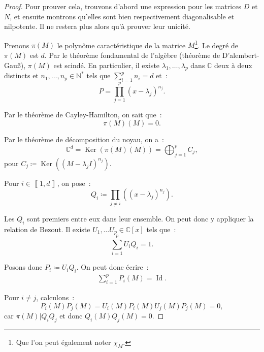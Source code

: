 \documentclass{report}
\theoremstyle{definition}
\theoremstyle{remark}
\numberwithin{equation}{section}
\newcommand{\C}{\mathbb C}
\newcommand{\N}{\mathbb N}
\newcommand{\Ns}{\N^{*}}
\DeclareMathOperator{\Ker}{Ker}
\DeclareMathOperator{\Id}{Id}
\newcommand{\intint}[2]{\left\llbracket#1, #2\right\rrbracket}
\begin{document}
			\begin{proof} Pour prouver cela, trouvons d'abord une expression pour les matrices $D$ et $N$, et ensuite montrons qu'elles sont bien respectivement
			diagonalisable et nilpotente. Il ne restera plus alors qu'à prouver leur unicité.

			Prenons $\pi(M)$ le polynôme caractéristique de la matrice $M$\footnote{Que l'on peut également noter $\chi_M$.}. Le degré de $\pi(M)$ est
			$d$. Par le théorème fondamental de l'algèbre (théorème de D'alembert-Gauß), $\pi(M)$ est scindé. En particulier, il existe $\lambda_1, \ldots, \lambda_p$
			dans $\C$ deux à deux distincts et $n_1, \ldots, n_p \in \Ns$ tels que $\sum_{i=1}^pn_i = d$ et~:
			\begin{equation}
				P = \prod_{j=1}^p\left(x- \lambda_j\right)^{n_j}.
			\end{equation}

			Par le théorème de Cayley-Hamilton, on sait que~:
			\begin{equation}
				\pi(M)(M) = 0.
			\end{equation}

			Par le théorème de décomposition du noyau, on a~:
			\begin{equation}
				\C^d = \Ker\left(\pi(M)(M)\right) = \bigoplus_{j=1}^pC_j,
			\end{equation}
			pour $C_j \coloneqq \Ker\left(\left(M - \lambda_jI\right)^{n_j}\right)$.

			Pour $i \in \intint 1d$, on pose~:
			\begin{equation}
				Q_i \coloneqq \prod_{j \neq i} \left(\left(x-\lambda_j\right)^{n_j}\right).
			\end{equation}

			Les $Q_i$ sont premiers entre eux dans leur ensemble. On peut donc y appliquer la relation de Bezout. Il existe $U_1, \ldots U_p \in \C[x]$ tels que~:
			\begin{equation}
				\sum_{i=1}^pU_iQ_i = 1.
			\end{equation}

			Posons donc $P_i \coloneqq U_iQ_i$. On peut donc écrire~:
			\begin{align}\label{eq:Dunford sum_Pi = Id}
				\sum_{i=1}^pP_i(M) = \Id.
			\end{align}

			Pour $i \neq j$, calculons~:
			\begin{equation}
				P_i(M)P_j(M) = U_i(M)P_i(M)U_j(M)P_j(M) = 0,
			\end{equation}
			car $\pi(M) | Q_iQ_j$ et donc $Q_i(M)Q_j(M) = 0$.


\end{proof}
\end{document}
